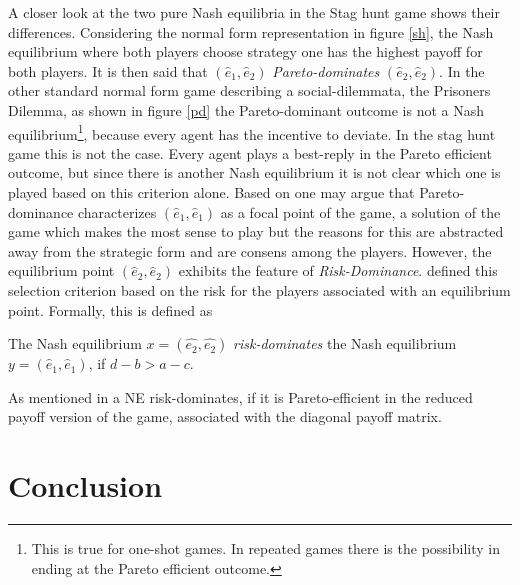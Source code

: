 \documentclass[12pt]{article}
\begin{document}
A closer look at the two pure Nash equilibria in the Stag hunt game 
shows their differences. Considering the normal form representation in figure 
\ref{sh}, the Nash equilibrium where both players choose strategy one has the highest payoff
for both players. It is then said that $(\hat{e}_1,\hat{e}_2)$ 
\textit{Pareto-dominates} $(\hat{e}_2,\hat{e}_2)$. In the other standard 
normal form game describing a social-dilemmata, the Prisoners Dilemma, as 
shown in figure \ref{pd} the Pareto-dominant outcome is not a 
Nash equilibrium\footnote{This is true for one-shot games. 
In repeated games there is the possibility in ending at the Pareto efficient 
outcome.}, because every agent has the incentive to deviate. In the stag hunt
game this is not the case. Every agent plays a best-reply in the Pareto efficient
outcome, but since there is another Nash equilibrium it is not clear 
which one is played based on this criterion alone. Based on \cite{schelling}
one may argue that Pareto-dominance characterizes $(\hat{e}_1,\hat{e}_1)$ 
as a focal point of the game, a solution of the game which makes the most sense to play but the reasons for this are abstracted away from the strategic form and are consens among
the players.  However, the equilibrium point
$(\hat{e}_2,\hat{e}_2)$ exhibits the feature of \textit{Risk-Dominance}. 
\cite{seltenharsanyigeneral} defined this selection criterion based on the
risk for the players associated with an equilibrium point. Formally, this is
defined as 
\begin{mydef}
         The Nash equilibrium $x=(\hat{e_2},\hat{e_2})$ \textit{risk-dominates} 
         the Nash equilibrium $y=(\hat{e}_1,\hat{e}_1)$, if $d-b > a-c$.
 \end{mydef}
 As mentioned in \cite{weibull} a NE risk-dominates, if it is Pareto-efficient
 in the reduced payoff version of the game, associated with the diagonal
 payoff matrix. 
\section{Conclusion}
\printbibliography
\end{document}
